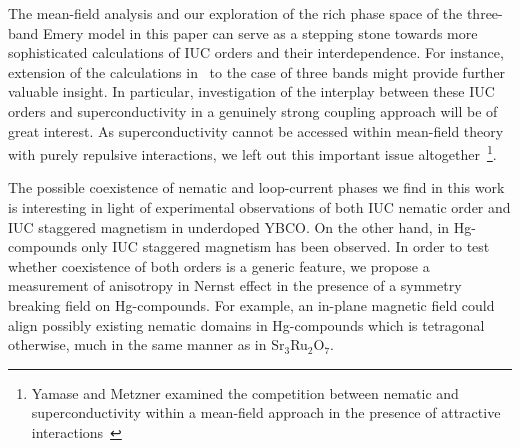 \documentclass[prb, twocolumn,showpacs,preprintnumbers,amsmath,amssymb, floatfix]{revtex4}
\begin{document}
The mean-field analysis and our exploration of the rich phase space of the three-band
Emery model in this paper can serve as a stepping stone
towards more sophisticated calculations of IUC orders and their
interdependence. For instance, extension of the calculations
in~\cite{halboth:2000, okamoto:2010} to the case of three bands might
provide further valuable insight. In particular, investigation of the
interplay between these IUC orders and superconductivity in a
genuinely strong coupling approach will be of great interest. As
superconductivity cannot be accessed within mean-field theory with
purely repulsive interactions, we left out this important issue
altogether~\footnote{Yamase and Metzner examined the competition
between nematic and superconductivity within a mean-field approach in the presence of attractive interactions~\cite{yamase:2007c}}. 

The possible coexistence of nematic and loop-current phases we find in
this work is interesting in light of experimental observations of
both IUC nematic order\cite{hinkov:2008, daou:2010} and  IUC staggered
magnetism in underdoped YBCO\cite{fauque:2006}. On the other hand, in Hg-compounds only
IUC staggered
magnetism has been observed\cite{li:2008}.
In order to test whether coexistence of both orders is a generic
feature, we propose a measurement of anisotropy
in Nernst effect in the presence of a symmetry breaking field on
Hg-compounds. For example, an in-plane magnetic field could align possibly existing nematic
domains in Hg-compounds which is tetragonal otherwise, much in the same
manner as in Sr$_3$Ru$_2$O$_7$\cite{borzi:2007}.



\appendix
\end{document}

